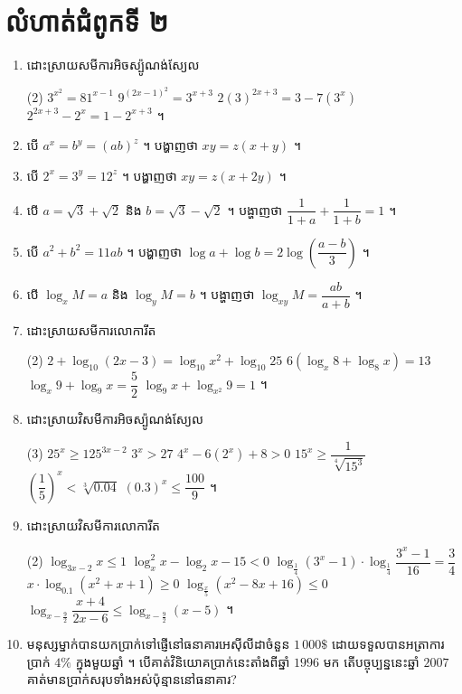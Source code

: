 \section*{លំហាត់ជំពូកទី ២}
\begin{enumerate}[1]
  \item ដោះស្រាយសមីការអិចស្ប៉ូណង់ស្យែល
  \begin{tasks}(2)
    \task $3^{x^2} = 81^{x-1}$
    \task $9^{(2x-1)^2} = 3^{x+3}$
    \task $2(3)^{2x+3} = 3 - 7(3^x)$
    \task $2^{2x+3} - 2^x = 1 - 2^{x+3}$ ។
  \end{tasks}
  \item បើ $a^x = b^y = (ab)^z$ ។ បង្ហាញថា $xy = z(x + y)$ ។
  \item បើ $2^x = 3^y = 12^z$ ។ បង្ហាញថា $xy = z(x + 2y)$ ។
  \item បើ $a = \sqrt{3} + \sqrt{2}$ និង $b = \sqrt{3} - \sqrt{2}$ ។ បង្ហាញថា $\dfrac{1}{1 + a} + \dfrac{1}{1 + b} = 1$ ។
  \item បើ $a^2 + b^2 = 11ab$ ។ បង្ហាញថា $\log a + \log b = 2\log\left(\dfrac{a - b}{3}\right)$ ។
  \item បើ $\log_x M = a$ និង $\log_y M = b$ ។ បង្ហាញថា $\log_{xy} M = \dfrac{ab}{a + b}$ ។
  \item ដោះស្រាយសមីការលោការីត
  \begin{tasks}(2)
    \task $2 + \log_{10}(2x - 3) = \log_{10} x^2 + \log_{10} 25$
    \task $6(\log_x 8 + \log_8 x) = 13$
    \task $\log_x 9 + \log_9 x = \dfrac{5}{2}$
    \task $\log_9 x + \log_{x^2} 9 = 1$ ។
  \end{tasks}
  \item ដោះស្រាយវិសមីការអិចស្ប៉ូណង់ស្យែល
  \begin{tasks}(3)
    \task $25^x \ge 125^{3x-2}$
    \task $3^x > 27$
    \task $4^x - 6(2^x) + 8 > 0$
    \task $15^x \ge \dfrac{1}{\sqrt[4]{15^3}}$
    \task $\left(\dfrac{1}{5}\right)^x < \sqrt[3]{0.04}$
    \task $(0.3)^x \le \dfrac{100}{9}$ ។
  \end{tasks}
  \item ដោះស្រាយវិសមីការលោការីត
  \begin{tasks}(2)
    \task $\log_{3x-2} x \le 1$
    \task $\log_x^2 x - \log_2 x - 15 < 0$
    \task $\log_{\frac{1}{4}}(3^x - 1) \cdot \log_{\frac{1}{4}}\dfrac{3^x - 1}{16} = \dfrac{3}{4}$
    \task $x \cdot \log_{0.1}(x^2 + x + 1) \ge 0$
    \task $\log_{\frac{x}{5}}(x^2 - 8x + 16) \le 0$
    \task $\log_{x - \frac{9}{2}} \dfrac{x + 4}{2x - 6} \le \log_{x - \frac{9}{2}}(x - 5)$ ។
  \end{tasks}
  \item មនុស្សម្នាក់បានយកប្រាក់ទៅផ្ញើនៅធនាគារអេស៊ីលីដាចំនួន $1\,000\$$ ដោយទទួលបានអត្រាការប្រាក់ $4\%$ ក្នុងមួយឆ្នាំ ។ បើគាត់វិនិយោគប្រាក់នេះតាំងពីឆ្នាំ $1996$ មក តើបច្ចុប្បន្ននេះឆ្នាំ $2007$ គាត់មានប្រាក់សរុបទាំងអស់ប៉ុន្មាននៅធនាគារ?

\end{enumerate}
